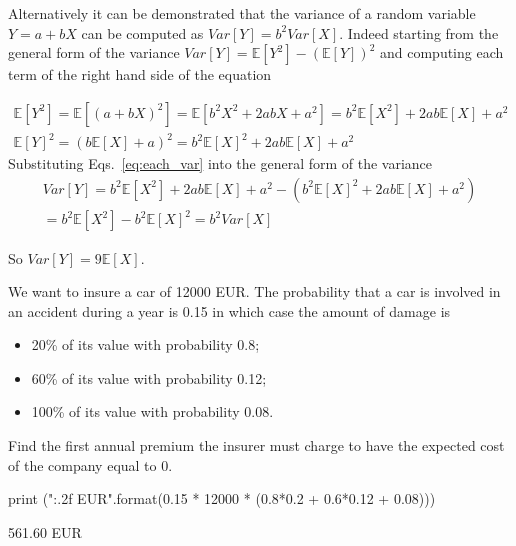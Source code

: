 \begin{solution}
Alternatively it can be demonstrated that the variance of a random variable $Y = a + bX$ can be computed as $Var[Y] = b^2 Var[X]$. Indeed starting from the general form of the variance $Var[Y] = \mathbb{E}[Y^2] - (\mathbb{E}[Y])^2$ and computing each term of the right hand side of the equation 

\begin{equation}
\begin{gathered}
\mathbb{E}[Y^2] = \mathbb{E}[(a+bX)^2] = \mathbb{E}[b^2X^2 + 2abX + a^2] = b^2\mathbb{E}[X^2] + 2ab\mathbb{E}[X]+ a^2  \\
\mathbb{E}[Y]^2 =  (b\mathbb{E}[X] + a)^2 = b^2\mathbb{E}[X]^2 + 2ab\mathbb{E}[X]+ a^2  
\label{eq:each_var}
\end{gathered}
\end{equation}
Substituting Eqs.~\ref{eq:each_var} into the general form of the variance 
\begin{equation}
\begin{gathered}
Var[Y] = b^2\mathbb{E}[X^2] + 2ab\mathbb{E}[X]+ a^2 - (b^2\mathbb{E}[X]^2 + 2ab\mathbb{E}[X]+ a^2) \\ 
= b^2\mathbb{E}[X^2] - b^2\mathbb{E}[X]^2 = b^2 Var[X]
\end{gathered}     
\end{equation}

So $Var[Y] = 9\mathbb{E}[X]$.
\end{solution}

\begin{question}
We want to insure a car of 12000 EUR. The probability that a car is involved in an accident during a year is 0.15 in which case the amount of damage is

\begin{itemize}
\tightlist
\item 20\% of its value with probability 0.8;
\item 60\% of its value with probability 0.12;
\item 100\% of its value with probability 0.08.
\end{itemize}
Find the first annual premium the insurer must charge to have the expected cost of the company equal to 0.
\end{question}

\cprotEnv\begin{solution}
\begin{ipython}
print ("{:.2f} EUR".format(0.15 * 12000 * (0.8*0.2 + 0.6*0.12 + 0.08)))
\end{ipython}
\begin{ioutput}
561.60 EUR
\end{ioutput}
\end{solution}

